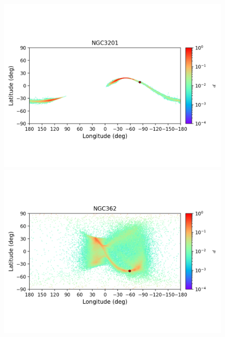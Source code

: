         \begin{figure}
            \begin{center}
                \includegraphics[clip=true, trim = 0mm 20mm 0mm 10mm, width=1\columnwidth]{images/error_plots_NGC3201.png}
                \includegraphics[clip=true, trim = 0mm 20mm 0mm 10mm, width=1\columnwidth]{images/error_plots_NGC362.png}
                

\end{center}
\end{figure}
